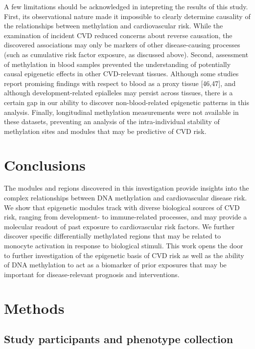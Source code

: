 \documentclass[]{bmcart}
\theoremstyle{definition}
\theoremstyle{definition}
\theoremstyle{definition}
\theoremstyle{remark}
\begin{document}
A few limitations should be acknowledged in intepreting the results of
this study. First, its observational nature made it impossible to
clearly determine causality of the relationships between methylation and
cardiovascular risk. While the examination of incident CVD reduced
concerns about reverse causation, the discovered associations may only
be markers of other disease-causing processes (such as cumulative risk
factor exposure, as discussed above). Second, assessment of methylation
in blood samples prevented the understanding of potentially causal
epigenetic effects in other CVD-relevant tissues. Although some studies
report promising findings with respect to blood as a proxy tissue
{[}46,47{]}, and although development-related epialleles may persist
across tissues, there is a certain gap in our ability to discover
non-blood-related epigenetic patterns in this analysis. Finally,
longitudinal methylation measurements were not available in these
datasets, preventing an analysis of the intra-individual stability of
methylation sites and modules that may be predictive of CVD risk.

\section{Conclusions}\label{conclusions}

The modules and regions discovered in this investigation provide
insights into the complex relationships between DNA methylation and
cardiovascular disease risk. We show that epigenetic modules track with
diverse biological sources of CVD risk, ranging from development- to
immune-related processes, and may provide a molecular readout of past
exposure to cardiovascular risk factors. We further discover specific
differentially methylated regions that may be related to monocyte
activation in response to biological stimuli. This work opens the door
to further investigation of the epigenetic basis of CVD risk as well as
the ability of DNA methylation to act as a biomarker of prior exposures
that may be important for disease-relevant prognosis and interventions.

\section{Methods}\label{methods}

\subsection{Study participants and phenotype
collection}\label{study-participants-and-phenotype-collection}
\end{document}
